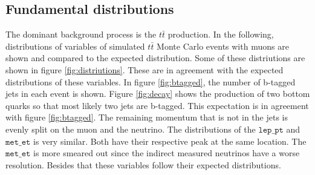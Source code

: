 \subsection{Fundamental distributions}
The dominant background process is the $t\bar{t}$ production.
In the following, distributions of variables of simulated $t\bar{t}$ Monte Carlo events with muons are shown and compared to the expected distribution.
Some of these distriutions are shown in figure \ref{fig:distriutions}.
These are in agreement with the expected distributions of these variables.
In figure \ref{fig:btagged}, the number of b-tagged jets in each event is shown.
Figure \ref{fig:decay} shows the production of two bottom quarks so that most likely two jets are b-tagged.
This expectation is in agreement with figure \ref{fig:btagged}.
The remaining momentum that is not in the jets is evenly split on the muon and the neutrino.
The distributions of the $\texttt{lep$\_$pt}$ and $\texttt{met$\_$et}$ is very similar.
Both have their respective peak at the same location.
The $\texttt{met$\_$et}$ is more smeared out since the indirect measured neutrinos have a worse resolution.
Besides that these variables follow their expected distributions.

